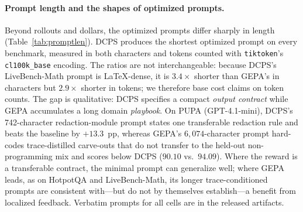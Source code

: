 \documentclass[runningheads]{llncs}
\begin{document}
\paragraph{Prompt length and the shapes of optimized prompts.}
Beyond rollouts and dollars, the optimized prompts differ sharply in length (Table~\ref{tab:promptlen}). DCPS produces the shortest optimized prompt on every benchmark, measured in both characters and tokens counted with \texttt{tiktoken}'s \texttt{cl100k\_base} encoding. The ratios are not interchangeable: because DCPS's LiveBench-Math prompt is LaTeX-dense, it is $3.4\times$ shorter than GEPA's in characters but $2.9\times$ shorter in tokens; we therefore base cost claims on token counts. The gap is qualitative: DCPS specifies a compact \emph{output contract} while GEPA accumulates a long domain \emph{playbook}. On PUPA (GPT-4.1-mini), DCPS's 742-character redaction-module prompt states one transferable redaction rule and beats the baseline by $+13.3$~pp, whereas GEPA's $6{,}074$-character prompt hard-codes trace-distilled carve-outs that do not transfer to the held-out non-programming mix and scores below DCPS ($90.10$ vs.\ $94.09$). Where the reward is a transferable contract, the minimal prompt can generalize well; where GEPA leads, as on HotpotQA and LiveBench-Math, its longer trace-conditioned prompts are consistent with---but do not by themselves establish---a benefit from localized feedback. Verbatim prompts for all cells are in the released artifacts.

\begin{table}[!t]
\centering
\caption{Optimized-prompt length in characters~/~tokens (GPT-4.1-mini), with tokens counted using \texttt{tiktoken}'s \texttt{cl100k\_base} encoding. DCPS is shortest on every benchmark.}
\label{tab:promptlen}
\end{table}
\end{document}
